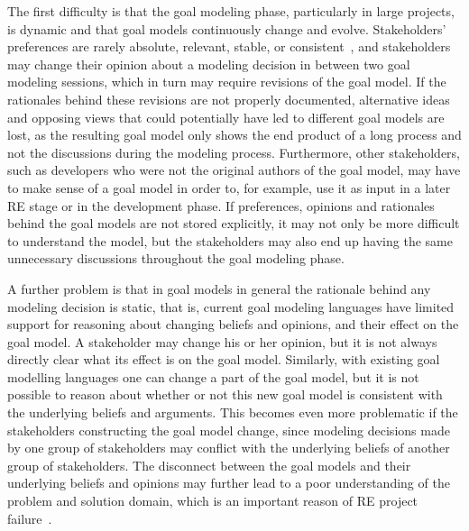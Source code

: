 The first difficulty is that the goal modeling phase, particularly in large projects, is dynamic and that goal models continuously change and evolve. Stakeholders' preferences are rarely absolute, relevant, stable, or consistent~\cite{march1978bounded}, and stakeholders may change their opinion about a modeling decision in between two goal modeling sessions, which in turn may require revisions of the goal model. If the rationales behind these revisions are not properly documented, alternative ideas and opposing views that could potentially have led to different goal models are lost, as the resulting goal model only shows the end product of a long process and not the discussions during the modeling process. Furthermore, other stakeholders, such as developers who were not the original authors of the goal model, may have to make sense of a goal model in order to, for example, use it as input in a later RE stage or in the development phase. If preferences, opinions and rationales behind the goal models are not stored explicitly, it may not only be more difficult to understand the model, but the stakeholders may also end up having the same unnecessary discussions throughout the goal modeling phase.

A further problem is that in goal models in general the rationale behind any modeling decision is static, that is, current goal modeling languages have limited support for reasoning about changing beliefs and opinions, and their effect on the goal model. A stakeholder may change his or her opinion, but it is not always directly clear what its effect is on the goal model. Similarly, with existing goal modelling languages one can change a part of the goal model, but it is not possible to reason about whether or not this new goal model is consistent with the underlying beliefs and arguments. This becomes even more problematic if the stakeholders constructing the goal model change, since modeling decisions made by one group of stakeholders may conflict with the underlying beliefs of another group of stakeholders. The disconnect between the goal models and their underlying beliefs and opinions may further lead to a poor understanding of the problem and solution domain, which is an important reason of RE project failure~\cite{curtis1988field}. 


